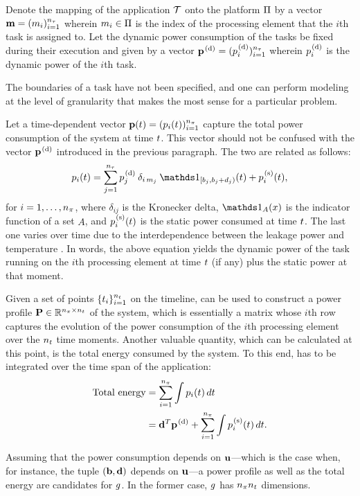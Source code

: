 Denote the mapping of the application $\mathcal{T}$ onto the platform $\Pi$ by a
vector $\mathbf{m} = (m_i)_{i = 1}^{{n_\tau}}$ wherein $m_i \in \Pi$ is the index of
the processing element that the $i$th task is assigned to. Let the dynamic power
consumption of the tasks be fixed during their execution and given by a vector
$\mathbf{p}^{\text{\kern0.1em(d)}} = (p^{\text{\kern0.1em(d)}}_i)_{i = 1}^{{n_\tau}}$ wherein $p^{\text{\kern0.1em(d)}}_i$ is the
dynamic power of the $i$th task.

\begin{remark}
The boundaries of a task have not been specified, and one can perform modeling
at the level of granularity that makes the most sense for a particular problem.
\end{remark}

Let a time-dependent vector $\mathbf{p}(t) = (p_i(t))_{i = 1}^{{n_\pi}}$ capture the
total power consumption of the system at time $t$. This vector should not be
confused with the vector $\mathbf{p}^{\text{\kern0.1em(d)}}$ introduced in the previous paragraph.
The two are related as follows:
\begin{equation} \elab{power}
  \p_i(\t) = \sum_{j = 1}^\nt \p^\dynamic_j \: \delta_{i\,m_j} \: \one_{[\b_j, \b_j + \d_j)}(\t) + \p^\static_i(\t),
\end{equation}
for $i = 1, \dots, {n_\pi}$, where $\delta_{ij}$ is the Kronecker delta, $\one_A(x)$
is the indicator function of a set $A$, and $p^{\text{\kern0.1em(s)}}_i(t)$ is the static
power consumed at time $t$. The last one varies over time due to the
interdependence between the leakage power and temperature \cite{liu2007}. In
words, the above equation yields the dynamic power of the task running on the
$i$th processing element at time $t$ (if any) plus the static power at that
moment.

Given a set of points $\{ t_i \}_{i = 1}^{n_t}$ on the timeline,  can
be used to construct a power profile $\mathbf{P} \in \mathbb{R}^{{n_\pi} \times {n_t}}$ of the
system, which is essentially a matrix whose $i$th row captures the evolution of
the power consumption of the $i$th processing element over the ${n_t}$ time
moments. Another valuable quantity, which can be calculated at this point, is
the total energy consumed by the system. To this end,  has to be
integrated over the time span of the application:
\begin{align}
  \text{Total energy} &= \sum_{i = 1}^\np \int \p_i(\t) \, d\t \elab{total-energy} \\
                      &= \vd^T \vp^\dynamic + \sum_{i = 1}^\np \int \p^\static_i(\t) \, d\t. \nonumber
\end{align}

Assuming that the power consumption depends on $\mathbf{u}$---which is the case when,
for instance, the tuple $(\mathbf{b}, \mathbf{d})$ depends on $\mathbf{u}$---a power profile as well
as the total energy are candidates for $g$. In the former case, $g$ has ${n_\pi}
{n_t}$ dimensions.
